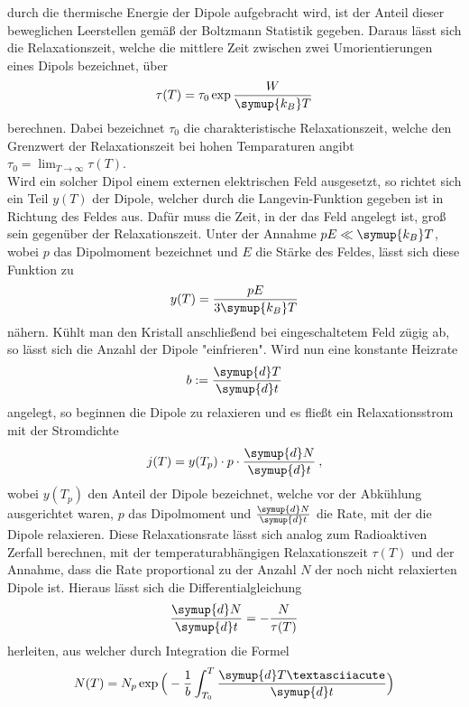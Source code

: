 durch die thermische Energie der Dipole aufgebracht wird, ist der Anteil dieser
beweglichen Leerstellen gemäß der Boltzmann Statistik gegeben. Daraus
lässt sich die Relaxationszeit, welche die mittlere Zeit zwischen zwei Umorientierungen
eines Dipols bezeichnet, über
\begin{equation}
  \tau(T)=\tau_0\exp{\frac{W}{\symup{k_B}T}}
  \label{eqn:tau}
\end{equation}
berechnen. Dabei bezeichnet $\tau_0$ die charakteristische Relaxationszeit, welche den Grenzwert
der Relaxationszeit bei hohen Temparaturen angibt $\tau_0=\lim_{T \to \infty}\tau(T)$. \\
Wird ein solcher Dipol einem externen elektrischen Feld ausgesetzt, so richtet sich
ein Teil $y(T)$ der Dipole, welcher durch die Langevin-Funktion gegeben ist in Richtung des Feldes
aus. Dafür muss die Zeit, in der das Feld angelegt ist, groß sein gegenüber
der Relaxationszeit.
Unter der Annahme $pE\ll\symup{k_B}T$, wobei $p$ das Dipolmoment bezeichnet und $E$ die
Stärke des Feldes, lässt sich diese Funktion zu
\begin{equation}
  y(T)=\frac{pE}{3\symup{k_B}T}
  \label{eqn:anteil}
\end{equation}
nähern. Kühlt man den Kristall anschließend bei eingeschaltetem Feld zügig ab, so lässt sich
die Anzahl der Dipole "einfrieren". Wird nun eine konstante Heizrate
\begin{equation}
  b:=\frac{\symup{d}T}{\symup{d}t}
  \label{eqn:hrate}
\end{equation}
angelegt, so beginnen die Dipole zu relaxieren und es fließt ein Relaxationsstrom mit der Stromdichte
\begin{equation}
  j(T)=y(T_p)\cdot p \cdot \frac{\symup{d}N}{\symup{d}t} \:,
\end{equation}
wobei $y(T_p)$ den Anteil der Dipole bezeichnet, welche vor der Abkühlung ausgerichtet waren,
$p$ das Dipolmoment und $\frac{\symup{d}N}{\symup{d}t}$ die Rate, mit der die Dipole relaxieren.
Diese Relaxationsrate lässt sich analog zum Radioaktiven Zerfall berechnen, mit der temperaturabhängigen
Relaxationszeit $\tau(T)$ und der Annahme, dass die Rate proportional zu der Anzahl $N$ der noch nicht relaxierten
Dipole ist. Hieraus lässt sich die Differentialgleichung
\begin{equation}
  \frac{\symup{d}N}{\symup{d}t}=-\frac{N}{\tau(T)}
  \label{eqn:DGL}
\end{equation}
herleiten, aus welcher durch Integration die Formel
\begin{equation}
  N(T)=N_p \exp{\Big(-\frac{1}{b}\int_{T_0}^{T} \frac{\symup{d}T´}{\symup{d}t}\Big)}
\end{equation}
